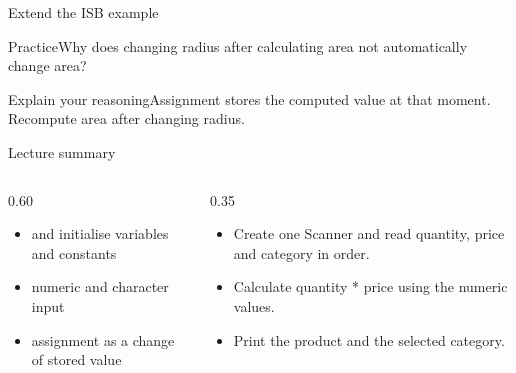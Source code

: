\documentclass[10pt,aspectratio=169]{beamer}
\begin{document}
\begin{frame}[fragile,t]{Extend the ISB example}
\begin{alertblock}{Practice}Why does changing radius after calculating area not automatically change area?\end{alertblock}\vspace{3mm}\begin{exampleblock}{Explain your reasoning}Assignment stores the computed value at that moment. Recompute area after changing radius.\end{exampleblock}
\end{frame}
\begin{frame}[fragile,t]{Lecture summary}
\begin{columns}[T,onlytextwidth]\begin{column}{0.60\textwidth}
\begin{itemize}
\item and initialise variables and constants
\item numeric and character input
\item assignment as a change of stored value
\end{itemize}
\end{column}\begin{column}{0.35\textwidth}\small
\begin{itemize}
\item Create one Scanner and read quantity, price and category in order.
\item Calculate quantity * price using the numeric values.
\item Print the product and the selected category.
\end{itemize}
\end{column}\end{columns}
\end{frame}
\end{document}
